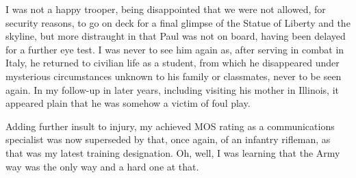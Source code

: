 \documentclass[../m3y]{subfiles}
\begin{document}
I was not a happy trooper, being disappointed that we were not allowed, for security reasons, to go on deck for a final glimpse of the Statue of Liberty and the skyline, but more distraught in that Paul was not on board, having been delayed for a further eye test. I was never to see him again as, after serving in combat in Italy, he returned to civilian life as a student, from which he disappeared under mysterious circumstances unknown to his family or classmates, never to be seen again. In my follow-up in later years, including visiting his mother in Illinois, it appeared plain that he was somehow a victim of foul play.

Adding further insult to injury, my achieved MOS rating as a communications specialist was now superseded by that, once again, of an infantry rifleman, as that was my latest training designation. Oh, well, I was learning that the Army way was the only way and a hard one at that.
\end{document}

